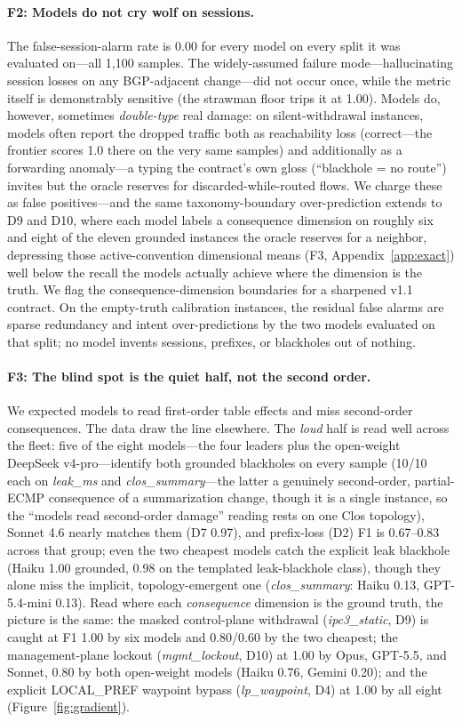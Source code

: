 \documentclass[11pt]{article}
\begin{document}
\paragraph{F2: Models do not cry wolf on sessions.} The false-session-alarm
rate is 0.00 for every model on every split it was evaluated on---all 1{,}100
samples. The widely-assumed failure mode---hallucinating session losses on
any BGP-adjacent change---did not occur once, while the metric itself is
demonstrably sensitive (the strawman floor trips it at 1.00). Models do,
however, sometimes \emph{double-type} real damage: on silent-withdrawal
instances, models often report the dropped traffic both as reachability
loss (correct---the frontier scores 1.0 there on the very same samples) and
additionally as a forwarding anomaly---a typing the contract's own gloss
(``blackhole = no route'') invites but the oracle reserves for
discarded-while-routed flows. We charge these as false positives---and the
same taxonomy-boundary over-prediction extends to D9 and D10, where each
model labels a consequence dimension on roughly six and eight of the eleven
grounded instances the oracle reserves for a neighbor, depressing those
active-convention dimensional means (F3, Appendix~\ref{app:exact}) well
below the recall the models actually achieve where the dimension is the
truth. We flag the consequence-dimension boundaries for a sharpened v1.1
contract. On the empty-truth
calibration instances, the residual false alarms are sparse redundancy and
intent over-predictions by the two models evaluated on that split; no model
invents sessions, prefixes, or blackholes out of nothing.

\paragraph{F3: The blind spot is the quiet half, not the second order.}
We expected models to read first-order table effects and miss second-order
consequences. The data draw the line elsewhere. The \emph{loud} half is
read well across the fleet: five of the eight models---the four leaders plus
the open-weight DeepSeek v4-pro---identify both grounded blackholes on
every sample (10/10 each on \emph{leak\_ms} and \emph{clos\_summary}---the
latter a genuinely second-order, partial-ECMP consequence of a summarization
change, though it is a single instance, so the ``models read second-order
damage'' reading rests on one Clos topology), Sonnet 4.6 nearly matches them
(D7 0.97), and
prefix-loss (D2) F1 is 0.67--0.83 across that group;
even the two cheapest models catch the explicit leak blackhole (Haiku 1.00
grounded, 0.98 on the templated leak-blackhole class), though they alone
miss the implicit, topology-emergent one (\emph{clos\_summary}: Haiku 0.13,
GPT-5.4-mini 0.13). Read where each
\emph{consequence} dimension is the ground truth, the picture is the same:
the masked control-plane withdrawal (\emph{ipc3\_static}, D9) is caught at
F1 1.00 by six models and 0.80/0.60 by the two cheapest; the
management-plane lockout (\emph{mgmt\_lockout}, D10) at 1.00 by Opus,
GPT-5.5, and Sonnet, 0.80 by both open-weight models (Haiku 0.76, Gemini
0.20); and the explicit LOCAL\_PREF waypoint bypass (\emph{lp\_waypoint},
D4) at 1.00 by all eight (Figure~\ref{fig:gradient}).
\end{document}
